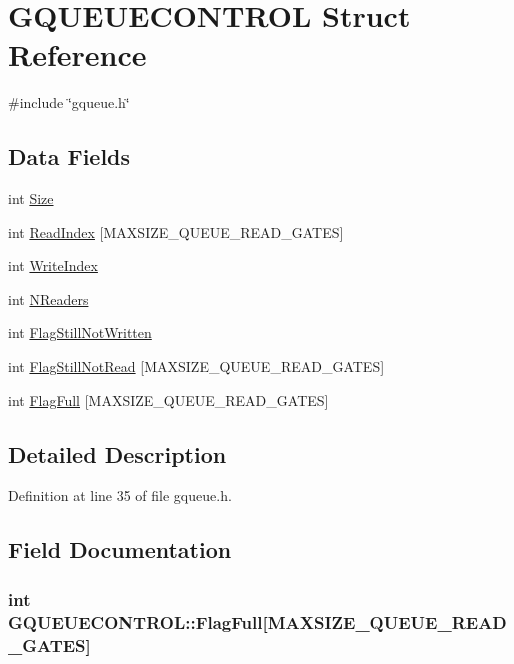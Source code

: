 \hypertarget{structGQUEUECONTROL}{
\section{GQUEUECONTROL Struct Reference}
\label{structGQUEUECONTROL}
}


{\ttfamily \#include \char`\"{}gqueue.h\char`\"{}}

\subsection*{Data Fields}
\begin{DoxyCompactItemize}
\item 
int \hyperlink{structGQUEUECONTROL_a4db75bcca77dbc6ea7d8d5c3cd3a365f}{Size}
\item 
int \hyperlink{structGQUEUECONTROL_aed43ab94887b0e203a23877fb26988b6}{ReadIndex} \mbox{[}MAXSIZE\_\-QUEUE\_\-READ\_\-GATES\mbox{]}
\item 
int \hyperlink{structGQUEUECONTROL_a614237a6b5ee3fca394e40a0274d5b43}{WriteIndex}
\item 
int \hyperlink{structGQUEUECONTROL_a790618cf693d7e4249fec2f5074b40e3}{NReaders}
\item 
int \hyperlink{structGQUEUECONTROL_a4d58bdb6b0dc93bb6034c4209b6e7915}{FlagStillNotWritten}
\item 
int \hyperlink{structGQUEUECONTROL_a9336a08f0410235b38b78638b0e3f882}{FlagStillNotRead} \mbox{[}MAXSIZE\_\-QUEUE\_\-READ\_\-GATES\mbox{]}
\item 
int \hyperlink{structGQUEUECONTROL_a5f54a26afa8554ed2f161b83aba14f5c}{FlagFull} \mbox{[}MAXSIZE\_\-QUEUE\_\-READ\_\-GATES\mbox{]}
\end{DoxyCompactItemize}


\subsection{Detailed Description}


Definition at line 35 of file gqueue.h.



\subsection{Field Documentation}
\hypertarget{structGQUEUECONTROL_a5f54a26afa8554ed2f161b83aba14f5c}{
\subsubsection[{FlagFull}]{\setlength{\rightskip}{0pt plus 5cm}int {\bf GQUEUECONTROL::FlagFull}\mbox{[}MAXSIZE\_\-QUEUE\_\-READ\_\-GATES\mbox{]}}}
\label{structGQUEUECONTROL_a5f54a26afa8554ed2f161b83aba14f5c}


